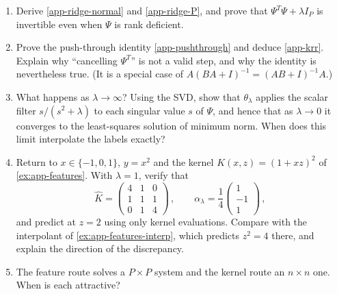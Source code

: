 \documentclass[11pt]{article}
\begin{document}
\begin{exercise}
\label{ex:app-ridge}
\begin{enumerate}
  \item Derive \eqref{app-ridge-normal} and \eqref{app-ridge-P}, and prove that $\Psi^T\Psi+\lambda I_P$ is invertible even when $\Psi$ is rank deficient.
  \item Prove the push-through identity \eqref{app-pushthrough} and deduce \eqref{app-krr}. Explain why ``cancelling $\Psi^T$'' is not a valid step, and why the identity is nevertheless true. (It is a special case of $A(BA+I)^{-1} = (AB+I)^{-1}A$.)
  \item\label{ex:app-ridge-limit} What happens as $\lambda\to\infty$? Using the SVD, show that $\theta_\lambda$ applies the scalar filter $s/(s^2+\lambda)$ to each singular value $s$ of $\Psi$, and hence that as $\lambda\to 0$ it converges to the least-squares solution of minimum norm. When does this limit interpolate the labels exactly?
  \item Return to $x\in\{-1,0,1\}$, $y=x^2$ and the kernel $K(x,z) = (1+xz)^2$ of \cref{ex:app-features}. With $\lambda = 1$, verify that
%
\begin{equation*}
    \hat K = \begin{pmatrix} 4 & 1 & 0 \\ 1 & 1 & 1 \\ 0 & 1 & 4 \end{pmatrix}\,,\qquad
    \alpha_\lambda = \frac{1}{4}\begin{pmatrix} 1 \\ -1 \\ 1 \end{pmatrix}\,,
\end{equation*}
%
and predict at $z=2$ using only kernel evaluations. Compare with the interpolant of \cref{ex:app-features-interp}, which predicts $z^2=4$ there, and explain the direction of the discrepancy.
  \item The feature route solves a $P\times P$ system and the kernel route an $n\times n$ one. When is each attractive?
\end{enumerate}
\end{exercise}
\end{document}
